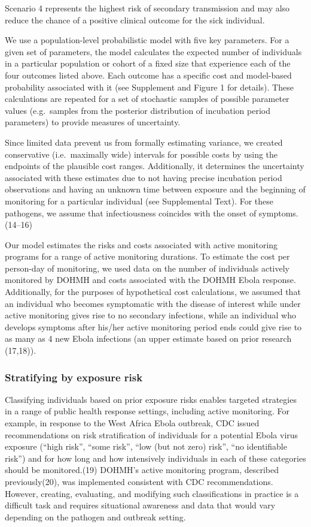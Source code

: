 \documentclass[]{article}
\begin{document}
Scenario 4 represents the highest risk of secondary transmission and may
also reduce the chance of a positive clinical outcome for the sick
individual.

We use a population-level probabilistic model with five key parameters.
For a given set of parameters, the model calculates the expected number
of individuals in a particular population or cohort of a fixed size that
experience each of the four outcomes listed above. Each outcome has a
specific cost and model-based probability associated with it (see
Supplement and Figure 1 for details). These calculations are repeated
for a set of stochastic samples of possible parameter values
(e.g.~samples from the posterior distribution of incubation period
parameters) to provide measures of uncertainty.

Since limited data prevent us from formally estimating variance, we
created conservative (i.e.~maximally wide) intervals for possible costs
by using the endpoints of the plausible cost ranges. Additionally, it
determines the uncertainty associated with these estimates due to not
having precise incubation period observations and having an unknown time
between exposure and the beginning of monitoring for a particular
individual (see Supplemental Text). For these pathogens, we assume that
infectiousness coincides with the onset of symptoms.(14--16)

Our model estimates the risks and costs associated with active
monitoring programs for a range of active monitoring durations. To
estimate the cost per person-day of monitoring, we used data on the
number of individuals actively monitored by DOHMH and costs associated
with the DOHMH Ebola response. Additionally, for the purposes of
hypothetical cost calculations, we assumed that an individual who
becomes symptomatic with the disease of interest while under active
monitoring gives rise to no secondary infections, while an individual
who develops symptoms after his/her active monitoring period ends could
give rise to as many as 4 new Ebola infections (an upper estimate based
on prior research (17,18)).

\subsubsection{Stratifying by exposure
risk}\label{stratifying-by-exposure-risk}

Classifying individuals based on prior exposure risks enables targeted
strategies in a range of public health response settings, including
active monitoring. For example, in response to the West Africa Ebola
outbreak, CDC issued recommendations on risk stratification of
individuals for a potential Ebola virus exposure (``high risk'', ``some
risk'', ``low (but not zero) risk'', ``no identifiable risk'') and for
how long and how intensively individuals in each of these categories
should be monitored.(19) DOHMH's active monitoring program, described
previously(20), was implemented consistent with CDC recommendations.
However, creating, evaluating, and modifying such classifications in
practice is a difficult task and requires situational awareness and data
that would vary depending on the pathogen and outbreak setting.
\end{document}
